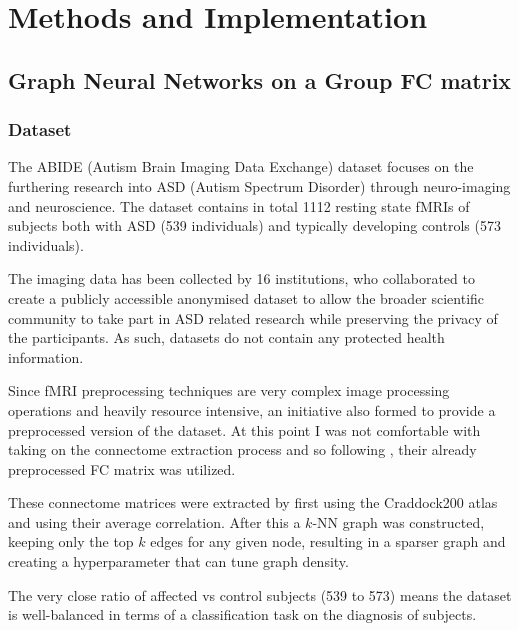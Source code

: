 \chapter{Methods and Implementation}

\section{Graph Neural Networks on a Group FC matrix}

	\subsection{Dataset}
	\label{sec:ABIDE}
	
	The ABIDE (Autism Brain Imaging Data Exchange) dataset\cite{di2014autism} focuses on the furthering research into ASD (Autism Spectrum Disorder) through neuro-imaging and neuroscience. The dataset contains in total 1112 resting state fMRIs of subjects both with ASD (539 individuals) and typically developing controls (573 individuals). 
	
	The imaging data has been collected by 16 institutions, who collaborated to create a publicly accessible anonymised dataset to allow the broader scientific community to take part in ASD related research while preserving the privacy of the participants. As such, datasets do not contain any protected health information. 
	
	Since fMRI preprocessing techniques are very complex image processing operations and heavily resource intensive, an initiative also formed to provide a preprocessed version of the dataset. At this point I was not comfortable with taking on the connectome extraction process and so following \cite{wang2021graph}, their already preprocessed FC matrix was utilized. 
	
	These connectome matrices were extracted by first using the Craddock200 atlas and using their average correlation. After this a $k$-NN graph was constructed, keeping only the top $k$ edges for any given node, resulting in a sparser graph and creating a hyperparameter that can tune graph density.
	
	
	The very close ratio of affected vs control subjects (539 to 573) means the dataset is well-balanced in terms of a classification task on the diagnosis of subjects. 
	
